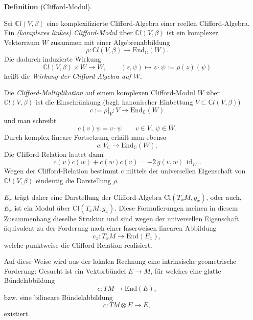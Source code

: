 \documentclass[10pt, letterpaper]{article}
\newcommand{\id}{\operatorname{id}}
\newcommand{\C}{\mathbb{C}}
\newcommand{\End}{\mathrm{End}}
\newcommand{\Cl}{\mathrm{Cl}}
\newcommand{\CustomHeading}[3]{%
  \par\medskip\noindent%
  \textbf{#1 #2} \textnormal{(#3)}.\enskip%
}
\newenvironment{DEF}[2]{\CustomHeading{Definition}{#1}{#2}}{}
\begin{document}
\begin{DEF}{}{Clifford-Modul}
Sei $\C l(V,\beta)$ eine komplexifizierte Clifford-Algebra einer reellen Clifford-Algebra. Ein \emph{(komplexes linkes) Clifford-Modul} über $\C l(V,\beta)$ ist ein komplexer Vektorraum $W$
zusammen mit einer Algebrenabbildung
\[
\rho:\C l(V,\beta)\longrightarrow \End_{\C}(W).
\]
Die dadurch induzierte Wirkung
\[
\C l(V,\beta)\times W\longrightarrow W,\qquad
(z,\psi)\longmapsto z\cdot \psi:=\rho(z)(\psi)
\]
heißt die \emph{Wirkung der Clifford-Algebra auf $W$}.

Die \emph{Clifford-Multiplikation} auf einem komplexen Clifford-Modul $W$ über
$\C l(V,\beta)$ ist die Einschränkung (bzgl. kanonischer Einbettung $V\subset \C l(V,\beta)$)
\[
c:=\rho|_V:V\to \End_{\C}(W)
\]
und man schreibt
\[
c(v)\psi=v\cdot\psi \qquad v\in V,\ \psi\in W.
\]
Durch komplex-lineare Fortsetzung erhält man ebenso
\[
c:V_{\C}\to \End_{\C}(W).
\]
Die Clifford-Relation lautet dann
\[
c(v)c(w)+c(w)c(v)=-2\,g(v,w)\,\id_{W}.
\]
Wegen der Clifford-Relation bestimmt $c$ mittels der universellen Eigenschaft von $\C l(V, \beta)$ eindeutig die Darstellung $\rho$.
\end{DEF}

\bigskip




\(E_x\) trägt daher eine Darstellung der Clifford-Algebra \(\Cl(T_xM,g_x)\), oder auch, \(E_x\) ist ein Modul über \(\Cl(T_xM,g_x)\). Diese Formulierungen meinen in diesem Zusammenhang dieselbe Struktur und sind wegen der universellen Eigenschaft äquivalent zu der Forderung nach einer faserweisen linearen Abbildung
\[
c_x:T_xM\longrightarrow \End(E_x),
\]
welche punktweise die Clifford-Relation realisiert.

Auf diese Weise wird aus der lokalen Rechnung eine intrinsische geometrische Forderung: Gesucht ist ein Vektorbündel \(E\to M\), für welches eine glatte Bündelabbildung
\[
c:TM\longrightarrow \End(E),
\]
bzw. eine bilineare Bündelabbildung
\[
c:TM\otimes E\longrightarrow E,
\]
existiert.
\end{document}
